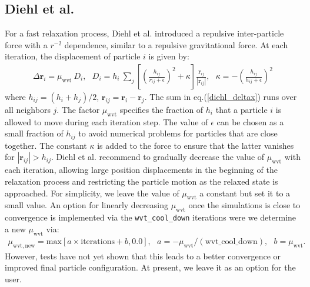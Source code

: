 \documentclass{article}
\begin{document}
\subsection{Diehl et al.}
For a fast relaxation process, Diehl et al. \cite{Diehl15} introduced a repulsive inter-particle force with a $r^{-2}$ dependence, similar to a repulsive gravitational force. At each iteration, the displacement of particle $i$ is given by:
\begin{align}
\Delta \mathbf{r}_i = \mu_\mathrm{wvt}  \: D_i, \:\:\: D_i = h_i \: \sum_j \left[\left(\frac{h_{ij}}{r_{ij} + \epsilon}\right)^2 + \kappa \right] \frac{\mathbf{r}_{ij}}{|\mathbf{r}_{ij}|}, \:\:\: \kappa = - \left(\frac{h_{ij}}{h_{ij} + \epsilon}\right)^2 
\label{diehl_deltax}
\end{align}
where $h_{ij} = (h_i + h_j)/2$, $\mathbf{r}_{ij} = \mathbf{r}_i - \mathbf{r}_j$. The sum in eq.(\ref{diehl_deltax}) runs over all neighbors $j$. The factor $\mu_\mathrm{wvt}$ specifies the fraction of $h_i$ that a particle $i$ is allowed to move during each iteration step. 
The value of $\epsilon$ can be chosen as a small fraction of $h_{ij}$ to avoid numerical problems for particles that are close together. 
The constant $\kappa$ is added to the force to ensure that the latter vanishes for $| \mathbf{r}_{ij}| > h_{ij}$.  
Diehl et al. recommend to gradually decrease the value of $\mu_\mathrm{wvt}$ with each iteration, allowing large position displacements in the beginning of the relaxation process and restricting the particle motion as the relaxed state is approached.  
For simplicity, we leave the value of $\mu_\mathrm{wvt}$ a constant but set it to a small value. 
An option for linearly decreasing  $\mu_\mathrm{wvt}$ once the simulations is close to convergence is implemented via the \texttt{wvt\_cool\_down} iterations were we determine a new $\mu_\mathrm{wvt}$ via:
\begin{align}
\mu_\mathrm{wvt, new} = \mathrm{max}[a \times \mathrm{iterations} + b,0.0], \:\:\: a = - \mu_\mathrm{wvt}/(\mathrm{wvt\_cool\_down}), \:\:\: b = \mu_\mathrm{wvt}.
\end{align}
However, tests have not yet shown that this leads to a better convergence or improved final particle configuration. 
At present, we leave it as an option for the user. 
\end{document}
